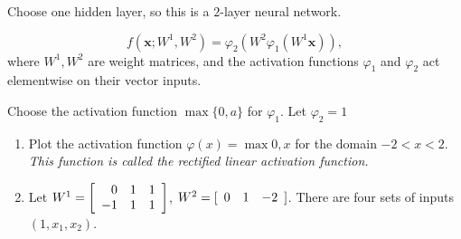 \documentclass[12pt,letterpaper,noanswers]{exam}
\newcommand{\vc}[1]{\boldsymbol{#1}}
\begin{document}
Choose one hidden layer, so this is a $2$-layer neural network.

\[f(\vc{x}; W^1, W^2) = \varphi_2(W^2\varphi_1(W^1\vc{x})),\] where $W^1, W^2$ are weight matrices, and the activation functions $\varphi_1$ and $\varphi_2$ act elementwise on their vector inputs.


Choose the activation function $\max\{0,a\}$ for $\varphi_1$.  Let $\varphi_2 = 1$
\begin{enumerate}[resume=classQ]
    \item Plot the activation function $\varphi(x) = \max{0,x}$ for the domain $-2<x<2$.  \emph{This function is called the rectified linear activation function.}
    \vspace{1in}
    \item Let $W^1 = \left[\begin{array}{r r r}
    0 & 1 & 1 \\
    -1 & 1 & 1 \\
    \end{array}\right]$, $W^2 = [\begin{array}{r r r}
    0 & 1 & -2
    \end{array}]$.  There are four sets of inputs $(1, x_1, x_2)$.
\end{enumerate}
\end{document}
